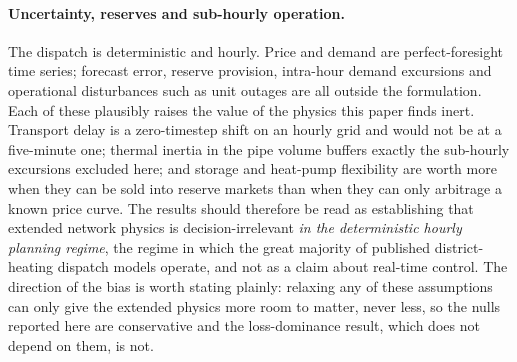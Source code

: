 
\paragraph{Uncertainty, reserves and sub-hourly operation.}
The dispatch is deterministic and hourly. Price and demand are perfect-foresight time
series; forecast error, reserve provision, intra-hour demand excursions and operational
disturbances such as unit outages are all outside the formulation. Each of these plausibly
raises the value of the physics this paper finds inert. Transport delay is a zero-timestep
shift on an hourly grid and would not be at a five-minute one; thermal inertia in the pipe
volume buffers exactly the sub-hourly excursions excluded here; and storage and heat-pump
flexibility are worth more when they can be sold into reserve markets than when they can
only arbitrage a known price curve. The results should therefore be read as establishing
that extended network physics is decision-irrelevant \emph{in the deterministic hourly
planning regime}, the regime in which the great majority of published district-heating
dispatch models operate, and not as a claim about real-time control. The direction of
the bias is worth stating plainly: relaxing any of these assumptions can only give the
extended physics more room to matter, never less, so the nulls reported here are conservative
and the loss-dominance result, which does not depend on them, is not.

